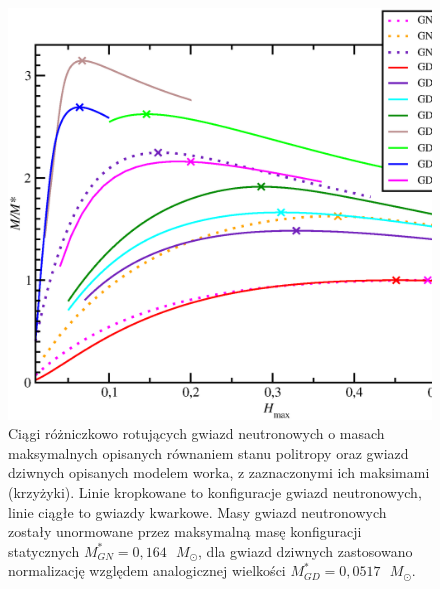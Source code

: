 \documentclass{bachelor_thesis}
\begin{document}
            \begin{figure}[h!]
            \centering
            \includegraphics[scale=.4]{figures/RysMmax.eps}
            \caption{Ciągi różniczkowo rotujących gwiazd neutronowych o masach maksymalnych opisanych równaniem stanu politropy oraz gwiazd dziwnych opisanych modelem worka, z zaznaczonymi ich maksimami (krzyżyki). Linie kropkowane to konfiguracje gwiazd neutronowych, linie ciągłe to gwiazdy kwarkowe. Masy gwiazd neutronowych zostały unormowane przez maksymalną masę konfiguracji statycznych $M^*_{GN}=0,164\textrm{ }M_\odot$, dla gwiazd dziwnych zastosowano normalizację względem analogicznej wielkości $M^*_{GD}=0,0517\textrm{ }M_\odot$.}
            \label{RysMmax}
            \end{figure}
\end{document}
